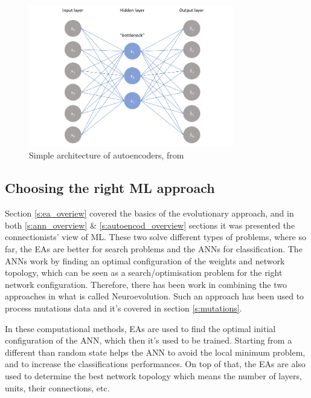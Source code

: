\begin{figure}[!htb]
  \centering\includegraphics[width=0.8\textwidth,height=0.5\textheight,keepaspectratio]{Images/Autoencoders/simple_autoencoders.png}
    \caption{Simple architecture of autoencoders, from \cite{Jordan2018-bc}}
    \label{fig:autoencoders}
\end{figure}
\FloatBarrier



\subsection{Choosing the right ML approach} \label{s:neuroevolution}

Section \ref{s:ea_overiew} covered the basics of the evolutionary approach, and in both \ref{s:ann_overview} \& \ref{s:autoencod_overview} sections it was presented the connectionists' view of ML. These two solve different types of problems, where so far, the EAs are better for search problems and the ANNs for classification. The ANNs work by finding an optimal configuration of the weights and network topology, which can be seen as a search/optimisation problem for the right network configuration. Therefore, there has been work in combining the two approaches in what is called Neuroevolution. Such an approach has been used to process mutations data and it's covered in section \ref{s:mutations}.

In these computational methods, EAs are used to find the optimal initial configuration of the ANN, which then it's used to be trained. Starting from a different than random state helps the ANN to avoid the local minimum problem, and to increase the classifications performances. On top of that, the EAs are also used to determine the best network topology which means the number of layers, units, their connections, etc.


